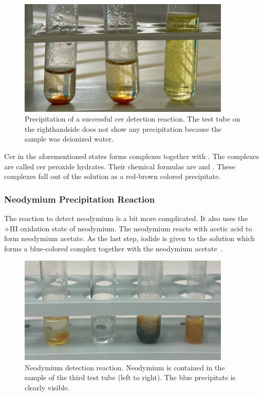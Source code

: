 \begin{figure}[H]
    \centering
    \includegraphics[width=0.9\textwidth]{./media/images/ree_precipitation_reaction_cropped}
    \caption{Precipitation of a successful cer detection reaction. The test tube on the righthandside does not show any precipitation because the sample was deionized water.}
    \label{fig:cer_precipitation_cropped1}
\end{figure}

Cer in the aforementioned states forms complexes together with .
The complexes are called cer peroxide hydrates.
Their chemical formulas are  and .
These complexes fall out of the solution as a red-brown colored precipitate.

\subsubsection{Neodymium Precipitation Reaction}
The reaction to detect neodymium is a bit more complicated.
It also uses the +III oxidation state of neodymium.
The neodymium reacts with acetic acid to form neodymium acetate.
As the last step, iodide is given to the solution which forms a blue-colored complex together with the neodymium acetate~\cite{janderblasius}.

\begin{figure}[H]
    \centering
    \includegraphics[width=0.9\textwidth]{./media/images/nd_precipitation_reaction_cropped}
    \caption{Neodymium detection reaction. Neodymium is contained in the sample of the third test tube (left to right). The blue precipitate is clearly visible.}
    \label{fig:nd_precipitation}
\end{figure}

